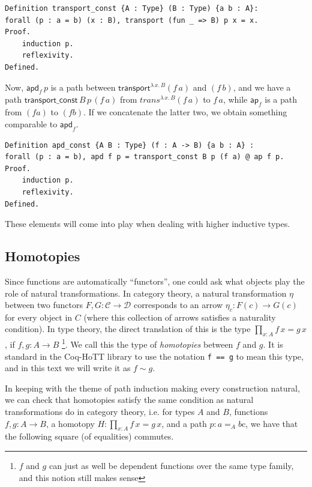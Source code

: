 \documentclass[12 pt]{amsart}
\theoremstyle{definition}
\theoremstyle{remark}
\newcommand{\trans}{\mathsf{transport}}
\newcommand{\ap}{\mathsf{ap}}
\newcommand{\apd}{\mathsf{apd}}
\newcommand{\transconst}{{\mathsf{transport\_const}\,}}
\begin{document}
\begin{lstlisting}
Definition transport_const {A : Type} (B : Type) {a b : A}: 
forall (p : a = b) (x : B), transport (fun _ => B) p x = x.
Proof.
    induction p.
    reflexivity.
Defined.
\end{lstlisting}

Now, $\apd_f \,p$ is a path between $\trans^{\lambda \,x.\, B} (f\, a)$ and $(f\, b)$, and we have a path $\transconst B \, p \, (f\,a)$ from $trans^{\lambda \,x.\, B} (f\, a)$ to $f\,a$, while $\ap_f$ is a path from $(f a)$ to $(f b)$. If we concatenate the latter two, we obtain something comparable to $\apd_f$.

\begin{lstlisting}
Definition apd_const {A B : Type} (f : A -> B) {a b : A} :
forall (p : a = b), apd f p = transport_const B p (f a) @ ap f p.
Proof.
    induction p.
    reflexivity.
Defined.
\end{lstlisting}

These elements will come into play when dealing with higher inductive types.

\subsection{Homotopies}
Since functions are automatically ``functors'', one could ask what objects play the role of natural transformations. In category theory, a natural transformation $\eta$ between two functors $F, G : \mathcal{C} \to \mathcal{D}$ corresponds to an arrow $\eta_c : F(c) \to G(c)$ for every object in $C$ (where this collection of arrows satisfies a naturality condition). In type theory, the direct translation of this is the type $\prod_{x : A} f \,x = g \,x$, if $f, g: A \to B$ \footnote{$f$ and $g$ can just as well be dependent functions over the same type family, and this notion still makes sense}. We call this the type of \textit{homotopies} between $f$ and $g$. It is standard in the Coq-HoTT library to use the notation \texttt{f == g} to mean this type, and in this text we will write it as $f \sim g$.

In keeping with the theme of path induction making every construction natural, we can check that homotopies satisfy the same condition as natural transformations do in category theory, i.e. for types $A$ and $B$, functions $f,g : A\to B$, a homotopy $H : \prod_{x : A} f\,x = g\,x$, and a path $p : a =_A b$c, we have that the following square (of equalities) commutes.

\begin{center}
\end{center}
\end{document}
